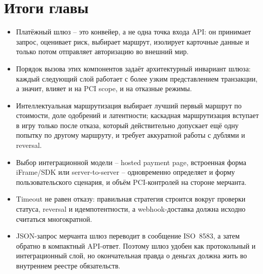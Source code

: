\section*{Итоги главы}
\begin{itemize}
  \item Платёжный шлюз -- это конвейер, а не одна точка входа API:
        он принимает запрос, оценивает риск, выбирает маршрут,
        изолирует карточные данные и только потом отправляет
        авторизацию во внешний мир.
  \item Порядок вызова этих компонентов задаёт архитектурный
        инвариант шлюза: каждый следующий слой работает с более
        узким представлением транзакции, а значит, влияет и на
        PCI scope, и на отказные режимы.
  \item Интеллектуальная маршрутизация выбирает лучший первый
        маршрут по стоимости, доле одобрений и латентности;
        каскадная маршрутизация вступает в игру только после
        отказа, который действительно допускает ещё одну попытку
        по другому маршруту, и требует аккуратной работы
        с дублями и reversal.
  \item Выбор интеграционной модели -- hosted payment page,
        встроенная форма iFrame/SDK или server-to-server --
        одновременно определяет и форму пользовательского
        сценария, и объём PCI-контролей на стороне мерчанта.
  \item Timeout не равен отказу: правильная стратегия строится
        вокруг проверки статуса, reversal и идемпотентности,
        а webhook-доставка должна исходно считаться многократной.
  \item JSON-запрос мерчанта шлюз переводит в сообщение
        ISO~8583, а затем обратно в компактный API-ответ.
        Поэтому шлюз удобен как протокольный и интеграционный
        слой, но окончательная правда о деньгах должна жить
        во внутреннем реестре обязательств.
\end{itemize}

